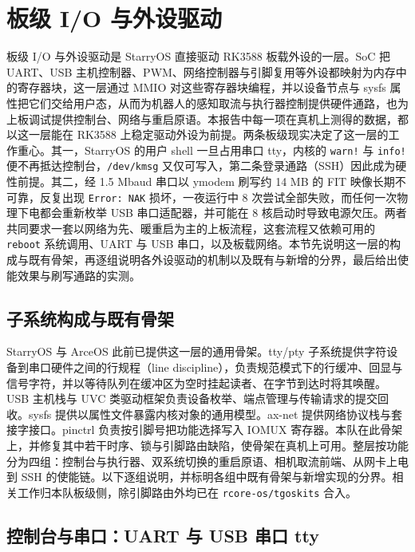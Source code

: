 \section{板级 I/O 与外设驱动}

板级 I/O 与外设驱动是 StarryOS 直接驱动 RK3588 板载外设的一层。SoC 把 UART、USB 主机控制器、PWM、网络控制器与引脚复用等外设都映射为内存中的寄存器块，这一层通过 MMIO 对这些寄存器块编程，并以设备节点与 sysfs 属性把它们交给用户态，从而为机器人的感知取流与执行器控制提供硬件通路，也为上板调试提供控制台、网络与重启原语。本报告中每一项在真机上测得的数据，都以这一层能在 RK3588 上稳定驱动外设为前提。两条板级现实决定了这一层的工作重心。其一，StarryOS 的用户 shell 一旦占用串口 tty，内核的 \texttt{warn!} 与 \texttt{info!} 便不再抵达控制台，\texttt{/dev/kmsg} 又仅可写入，第二条登录通路（SSH）因此成为硬性前提。其二，经 1.5 Mbaud 串口以 ymodem 刷写约 14 MB 的 FIT 映像长期不可靠，反复出现 \texttt{Error: NAK} 损坏，一夜运行中 8 次尝试全部失败，而任何一次物理下电都会重新枚举 USB 串口适配器，并可能在 8 核启动时导致电源欠压。两者共同要求一套以网络为先、暖重启为主的上板流程，这套流程又依赖可用的 \texttt{reboot} 系统调用、UART 与 USB 串口，以及板载网络。本节先说明这一层的构成与既有骨架，再逐组说明各外设驱动的机制以及既有与新增的分界，最后给出使能效果与刷写通路的实测。

\subsection{子系统构成与既有骨架}

StarryOS 与 ArceOS 此前已提供这一层的通用骨架。tty/pty 子系统提供字符设备到串口硬件之间的行规程（line discipline），负责规范模式下的行缓冲、回显与信号字符，并以等待队列在缓冲区为空时挂起读者、在字节到达时将其唤醒。USB 主机栈与 UVC 类驱动框架负责设备枚举、端点管理与传输请求的提交回收。sysfs 提供以属性文件暴露内核对象的通用模型。ax-net 提供网络协议栈与套接字接口。pinctrl 负责按引脚号把功能选择写入 IOMUX 寄存器。本队在此骨架上，并修复其中若干时序、锁与引脚路由缺陷，使骨架在真机上可用。整层按功能分为四组：控制台与执行器、双系统切换的重启原语、相机取流前端、从网卡上电到 SSH 的使能链。以下逐组说明，并标明各组中既有骨架与新增实现的分界。相关工作归本队板级侧，除引脚路由外均已在 \texttt{rcore-os/tgoskits} 合入。

\subsection{控制台与串口：UART 与 USB 串口 tty}


